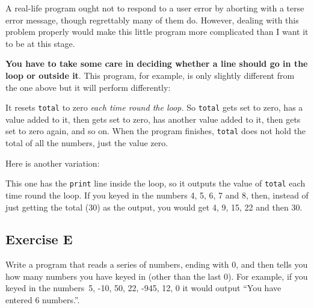 A real-life program ought not to respond to a user error by aborting
with a terse error message, though regrettably many of them do.
However, dealing with this problem properly would make this little program
more complicated than I want it to be at this stage.

\pagebreak

\textbf{You have to take some care in deciding whether a line should go in the
loop or outside it}.  This program, for example, is only slightly different
from the one above but it will perform differently:


It resets \texttt{total} to zero \emph{each time round the loop.}  So
\texttt{total} gets set to zero,
has a value added to it, then gets set to zero, has another value added to
it, then gets set to zero again, and so on.  When the program finishes,
\texttt{total} does not hold the total of all the numbers, just the value
zero.


Here is another variation:


This one has the \texttt{print} line inside the loop, so it outputs the value
of \texttt{total} each time round the loop.  If you keyed in the numbers
4, 5, 6, 7 and 8, then, instead of just getting the total (30) as the output,
you would get 4, 9, 15, 22 and then 30.

\subsection*{Exercise E}

Write a program that reads a series of numbers, ending with 0, and then tells you how
many numbers you have keyed in (other than the last 0).  For example, if you keyed in the
numbers~5, -10, 50, 22, -945, 12, 0 it would output ``You have entered 6
numbers.''.





